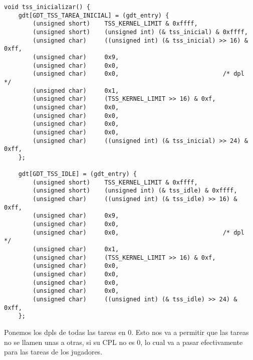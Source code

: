 \begin{codesnippet}
\begin{verbatim}
void tss_inicializar() {
    gdt[GDT_TSS_TAREA_INICIAL] = (gdt_entry) {
        (unsigned short)    TSS_KERNEL_LIMIT & 0xffff,                          
        (unsigned short)    (unsigned int) (& tss_inicial) & 0xffff,            
        (unsigned char)     ((unsigned int) (& tss_inicial) >> 16) & 0xff,      
        (unsigned char)     0x9,                                                
        (unsigned char)     0x0,                                                
        (unsigned char)     0x0,                             /* dpl          */
        (unsigned char)     0x1,                                                
        (unsigned char)     (TSS_KERNEL_LIMIT >> 16) & 0xf,                     
        (unsigned char)     0x0,                                                
        (unsigned char)     0x0,                                                
        (unsigned char)     0x0,                                                
        (unsigned char)     0x0,                                                
        (unsigned char)     ((unsigned int) (& tss_inicial) >> 24) & 0xff,      
    };

    gdt[GDT_TSS_IDLE] = (gdt_entry) {
        (unsigned short)    TSS_KERNEL_LIMIT & 0xffff,                          
        (unsigned short)    (unsigned int) (& tss_idle) & 0xffff,               
        (unsigned char)     ((unsigned int) (& tss_idle) >> 16) & 0xff,         
        (unsigned char)     0x9,                                                
        (unsigned char)     0x0,                                                
        (unsigned char)     0x0,                             /* dpl          */
        (unsigned char)     0x1,                                                
        (unsigned char)     (TSS_KERNEL_LIMIT >> 16) & 0xf,                     
        (unsigned char)     0x0,                                                
        (unsigned char)     0x0,                                                
        (unsigned char)     0x0,                                                
        (unsigned char)     0x0,                                                
        (unsigned char)     ((unsigned int) (& tss_idle) >> 24) & 0xff,         
    };

\end{verbatim}
\end{codesnippet}
Ponemos los dpls de todas las tareas en 0. Esto nos va a permitir que las tareas no se llamen unas a otras, si su CPL no es 0, lo cual va a pasar efectivamente para las tareas de los jugadores.
